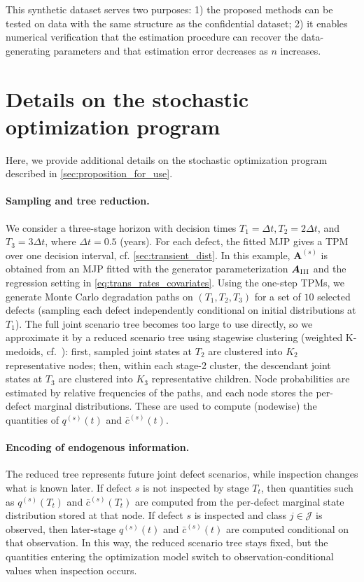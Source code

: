 This synthetic dataset serves two purposes: 1) the proposed methods can be tested on data with the same structure as the confidential dataset; 2) it enables numerical verification that the estimation procedure can recover the data-generating parameters and that estimation error decreases as $n$ increases.




\newpage

\section{Details on the stochastic optimization program} \label{sec:stochastic_optimization_details}
Here, we provide additional details on the stochastic optimization program described in \cref{sec:proposition_for_use}.
\paragraph{Sampling and tree reduction.}
We consider a three-stage horizon with decision times
$T_1=\Delta t, T_2=2\Delta t$, and $T_3=3\Delta t$, where $\Delta t=0.5$ (years).
For each defect, the fitted MJP gives a TPM over one decision interval, cf. \cref{sec:transient_dist}. In this example, $\bm A^{(s)}$ is obtained from an MJP fitted with the generator parameterization $\bm{A}_{\RN{3}}$ and the regression setting in \cref{eq:trans_rates_covariates}.
Using the one-step TPMs, we generate Monte Carlo degradation paths on $(T_1,T_2,T_3)$ for a set of $10$ selected defects (sampling each defect independently conditional on initial distributions at $T_1$).
The full joint scenario tree becomes too large to use directly, so we approximate it by a reduced scenario tree using stagewise clustering (weighted K-medoids, cf.\ \citet{park2009a}): first, sampled joint states at $T_2$ are clustered into $K_2$ representative nodes; then, within each stage-2 cluster, the descendant joint states at $T_3$ are clustered into $K_3$ representative children.
Node probabilities are estimated by relative frequencies of the paths, and each node stores the per-defect marginal distributions. These are used to compute (nodewise) the quantities of $q^{(s)}(t)$ and $\bar c^{(s)}(t)$.

\paragraph{Encoding of endogenous information.}
The reduced tree represents future joint defect scenarios, while inspection changes what is known later.
If defect $s$ is not inspected by stage $T_t$, then quantities such as $q^{(s)}(T_t)$ and $\bar c^{(s)}(T_t)$ are computed from the per-defect marginal state distribution stored at that node.
If defect $s$ is inspected and class $j\in\mathcal J$ is observed, then later-stage $q^{(s)}(t)$ and $\bar c^{(s)}(t)$ are computed conditional on that observation.
In this way, the reduced scenario tree stays fixed, but the quantities entering the optimization model switch to observation-conditional values when inspection occurs.


